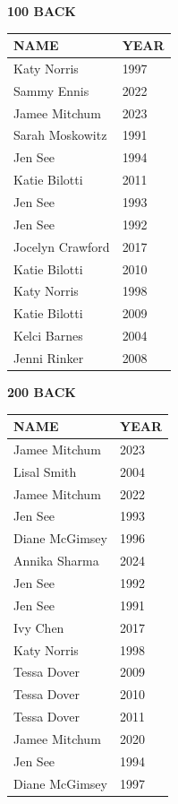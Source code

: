 \begin{table}[H]
\centering
\begin{minipage}[t]{0.48\textwidth}
\centering
\textbf{100 BACK}\\[0.1cm]
\begin{tabular}{@{}p{2.8cm}p{1.2cm}@{}}
\hline
    \textbf{NAME} & \textbf{YEAR} \\
\hline
    Katy Norris & 1997 \\
    Sammy Ennis & 2022 \\
    Jamee Mitchum & 2023 \\
    Sarah Moskowitz & 1991 \\
    Jen See & 1994 \\
    Katie Bilotti & 2011 \\
    Jen See & 1993 \\
    Jen See & 1992 \\
    Jocelyn Crawford & 2017 \\
    Katie Bilotti & 2010 \\
    Katy Norris & 1998 \\
    Katie Bilotti & 2009 \\
    Kelci Barnes & 2004 \\
    Jenni Rinker & 2008 \\
\hline
\end{tabular}
\end{minipage}\hfill
\begin{minipage}[t]{0.48\textwidth}
\centering
\textbf{200 BACK}\\[0.1cm]
\begin{tabular}{@{}p{2.8cm}p{1.2cm}@{}}
\hline
    \textbf{NAME} & \textbf{YEAR} \\
\hline
    Jamee Mitchum & 2023 \\
    Lisal Smith & 2004 \\
    Jamee Mitchum & 2022 \\
    Jen See & 1993 \\
    Diane McGimsey & 1996 \\
    Annika Sharma & 2024 \\
    Jen See & 1992 \\
    Jen See & 1991 \\
    Ivy Chen & 2017 \\
    Katy Norris & 1998 \\
    Tessa Dover & 2009 \\
    Tessa Dover & 2010 \\
    Tessa Dover & 2011 \\
    Jamee Mitchum & 2020 \\
    Jen See & 1994 \\
    Diane McGimsey & 1997 \\
\hline
\end{tabular}
\end{minipage}
\end{table}


